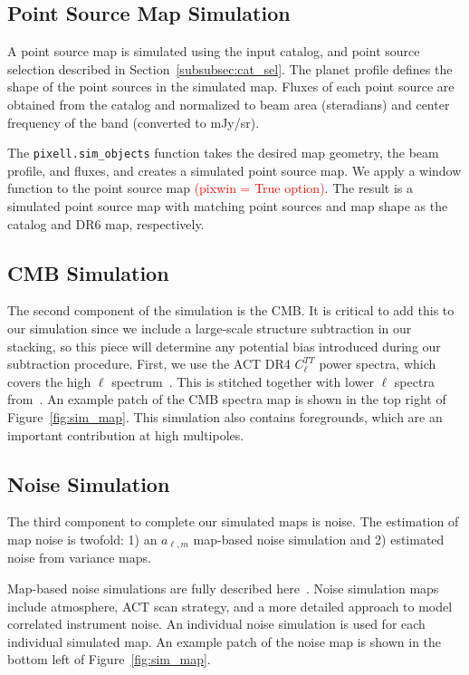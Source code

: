 \subsection{Point Source Map Simulation}
\label{subsec:sim_ptsrc}
A point source map is simulated using the input catalog, and point source selection described in Section~\ref{subsubsec:cat_sel}.  The planet profile defines the shape of the point sources in the simulated map.  Fluxes of each point source are obtained from the catalog and normalized to beam area (steradians) and center frequency of the band (converted to mJy/sr).

The \verb|pixell.sim_objects| function takes the desired map geometry, the beam profile, and fluxes, and creates a simulated point source map.  We apply a window function to the point source map
\textcolor{red}{(pixwin = True option)}.  The result is a simulated point source map with matching point sources and map shape as the catalog and DR6 map, respectively. 

\subsection{CMB Simulation}
\label{subsec:sim_cmb}
The second component of the simulation is the CMB.  It is critical to add this to our simulation since we include a large-scale structure subtraction in our stacking, so this piece will determine any potential bias introduced during our subtraction procedure.  First, we use the ACT DR4 $C_{\ell}^{TT}$ power spectra, which covers the high $\ell$ spectrum~\cite{aiola_2020}.  This is stitched together with lower $\ell$ spectra from~\cite{YYY}.  An example patch of the CMB spectra map is shown in the top right of Figure~\ref{fig:sim_map}. 
 This simulation also contains foregrounds, which are an important contribution at high multipoles.

\subsection{Noise Simulation}
\label{subsec:sim_noise}
The third component to complete our simulated maps is noise.  The estimation of map noise is twofold: 1) an $a_{\ell,m}$ map-based noise simulation and 2) estimated noise from variance maps.

Map-based noise simulations are fully described here~\cite{}.  Noise simulation maps include atmosphere, ACT scan strategy, and a more detailed approach to model correlated instrument noise.  An individual noise simulation is used for each individual simulated map.  An example patch of the noise map is shown in the bottom left of Figure~\ref{fig:sim_map}.

